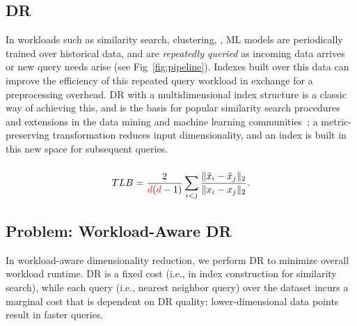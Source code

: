 \subsection{DR }

In workloads such as similarity search, clustering, , ML models are periodically trained over historical data, and are \emph{repeatedly queried} as incoming data arrives or new query needs arise (see Fig~\ref{fig:pipeline}). 
Indexes built over this data can improve the efficiency of this repeated query workload in exchange for a preprocessing overhead.
DR with a multidimensional index structure is a classic way of achieving this, and is the basis for popular similarity search procedures and extensions in the data mining and machine learning communities~\cite{keogh-indexing,local-dr,charu-ss,dynamic-ss,dm-book,humming-index,decade,search}; a metric-preserving transformation reduces input dimensionality, and an index is built in this new space for subsequent queries.


\subsubsection*{}
\begin{equation}
\label{eq:tlb}
TLB = \frac{2}{{\color{red}d}({\color{red}d}-1)}\sum_{i<j}\frac{\| \tilde{x}_i -  \tilde{x}_j \|_2 }{\| x_i -  x_j\|_2 }.
\end{equation}


\subsection{Problem: Workload-Aware DR}
\label{subsec:wadr}

In workload-aware dimensionality reduction, we perform DR to minimize overall workload runtime.
DR is a fixed cost (i.e., in index construction for similarity search), while each query (i.e., nearest neighbor query) over the dataset incurs a marginal cost that is dependent on DR quality: lower-dimensional data points result in faster queries. 

